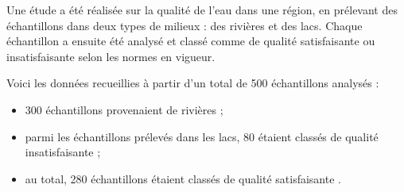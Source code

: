 Une étude a été réalisée sur la qualité de l'eau dans une région, en prélevant des échantillons dans deux types de milieux : des rivières et des lacs. Chaque échantillon a ensuite été analysé et classé comme de qualité \og satisfaisante \fg{} ou \og insatisfaisante \fg{} selon les normes en vigueur.

Voici les données recueillies à partir d'un total de 500 échantillons analysés :
\begin{itemize}
	\item 300 échantillons provenaient de rivières ;
	\item parmi les échantillons prélevés dans les lacs, 80 étaient classés de qualité \og insatisfaisante \fg{} ;
	\item au total, 280 échantillons étaient classés de qualité \og satisfaisante \fg.
\end{itemize}

